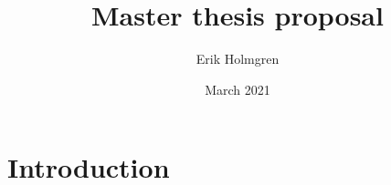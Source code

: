 \documentclass[12pt, a4paper]{article}
\author{Erik Holmgren}
\title{Master thesis proposal}
\date{March 2021}
\begin{document}
\maketitle
\section{Introduction}
\cite{maussionOpenGlobalGlacier2019}
\printbibliography
\end{document}
